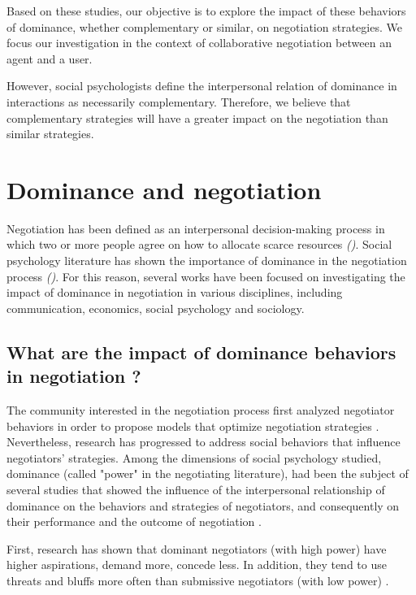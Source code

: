 \documentclass[10pt, a4paper, twocolumn]{article} %
\begin{document}
	Based on these studies, our objective is to explore the impact of these  behaviors of dominance, whether complementary or similar, on negotiation strategies. We focus our investigation in the context of collaborative negotiation between an agent and a user. 
	 
	However, social psychologists define the interpersonal relation of dominance in interactions as necessarily complementary. Therefore, we believe that complementary strategies will have a greater impact on the negotiation than similar strategies.
 
\section{Dominance and negotiation}	
	\label{sec:Dom}
	Negotiation has been defined as an interpersonal decision-making process in which two or more people agree on how to allocate scarce resources \emph{(\cite {thompson2000mind})}.  Social psychology literature has shown the importance of dominance in the negotiation process \emph{(\cite{de1995impact,van2006power,fiske1993controlling})}. For this reason, several works have been focused on investigating the impact of dominance in negotiation in various disciplines, including communication, economics, social psychology and sociology.
	
	\subsection{What are the impact of dominance behaviors in negotiation ?}
	
			The community interested in the negotiation process first analyzed negotiator behaviors in order to propose models that optimize negotiation strategies \cite{thompson2010negotiation}.
			Nevertheless, research has progressed to address  social behaviors that influence negotiators' strategies. 
			Among the dimensions of social psychology studied, dominance (called "power" in the negotiating literature), had been the subject of several studies that showed the influence of the interpersonal relationship of dominance on the behaviors and strategies of negotiators, and consequently on their performance and the outcome of negotiation \cite{de1995impact,van2006power}.
			
			First, research has shown that dominant negotiators (with high power) have higher aspirations, demand more, concede less. In addition, they tend to use threats and bluffs more often than submissive negotiators (with low power) \cite{de1995impact}.
			
\end{document}
